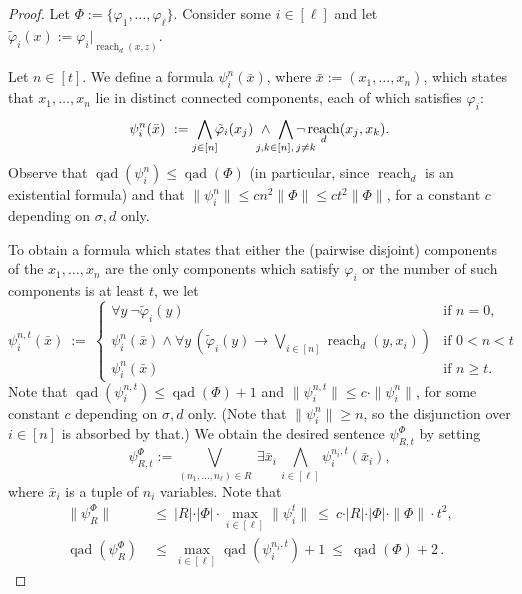 \documentclass[11pt]{article}
\renewcommand{\phi}{\varphi}
\newcommand{\size}[1]{\|#1\|}
\newcommand{\qad}[1]{\operatorname{qad}(#1)}
\newcommand{\absval}[1]{\vert #1 \vert}
\newcommand{\limplies}{\rightarrow}
\newcommand{\biglor}{\bigvee}
\newcommand{\bigland}{\bigwedge}
\newcommand{\rela}[2]{\ensuremath{{#1|}_{#2}}}
\DeclareMathOperator{\reach}{reach}
\newcommand{\set}[1]{\{#1\}}
\begin{document}
\begin{proof}
  Let $\Phi := \set{\phi_1, \ldots, \phi_\ell}$.
  Consider some $i\in
  [\ell]$ and let ${\tilde\phi}_{i}(x):=\rela{\phi_{i}}{\reach_{d}(x,z)}$.

  Let $n\in [t]$. We define a formula $\psi^{n}_{i}(\bar{x})$, where
  $\bar{x}:=(x_1, \ldots, x_n)$, which states that $x_1,\ldots,x_n$
  lie in distinct connected components, each of which satisfies
  $\phi_i$:
  \begin{align*}
    \psi^{n}_{i}(\bar{x}) \ := \ \smashoperator{\bigland_{j \in
        [n]}} {\tilde\phi}_{i}(x_j) \ \land \
    \smashoperator{\bigland_{j,k \in [n],\, j\neq k}} \lnot
    \reach_d(x_j,x_k).
  \end{align*}
  Observe that $\qad{\psi^{n}_{i}} \leq \qad{\Phi}$ (in particular,
  since $\reach_d$ is an existential formula) and that
  $\size{\psi^{n}_{i}} \leq c n^2 \size{\Phi} \leq c t^2 \size{\Phi}$,
  for a constant $c$ depending on $\sigma,d$ only.

  To obtain a formula which states that either the (pairwise disjoint)
  components of the $x_1, \ldots, x_n$ are the only components which
  satisfy $\phi_i$ or the number of such components is at least $t$,
  we let
  \[
  \psi^{n,t}_{i}(\bar{x})\ :=\
  \begin{cases}
    \forall y\ \lnot{\tilde\phi}_{i}(y) &\text{if }n = 0,
    \\
    \psi^{n}_{i}(\bar{x}) \land \forall y\,({\tilde\phi}_{i}(y)
    \limplies \biglor_{i\in [n]} \reach_d(y,x_i)) &\text{if $0 <
      n < t$}
    \\
    \psi^{n}_{i}(\bar{x}) &\text{if $n \geq t$}.
  \end{cases}
  \]
  Note that $\qad{\psi^{n,t}_{i}} \leq \qad{\Phi} + 1$ and
  $\size{\psi^{n,t}_{i}} \leq c \cdot \size{\psi^{n}_{i}}$, for some constant $c$
  depending on $\sigma,d$ only. (Note that $\size{\psi^n_i} \geq n$, so the
  disjunction over $i \in [n]$ is absorbed by that.) We obtain the desired
  sentence $\psi^{\Phi}_{R,t}$ by setting 
  \[
  \psi^{\Phi}_{R,t} := \biglor_{(n_1, \ldots, n_\ell)\in R} \
  \exists {\bar x}_i\,\bigland_{i \in [\ell]}  \psi^{n_i,t}_{i}({\bar x}_i),
  \]
  where ${\bar x}_i$ is a tuple of $n_i$ variables. Note that
  \[\begin{split}
    \size{\psi^{\Phi}_{R}} & \ \leq \ \absval{R} \cdot \absval{\Phi} \cdot \max_{i\in [\ell]} \size{\psi^{t}_{i}} \ \leq \ c
    \cdot \absval{R} \cdot \absval{\Phi} \cdot \size{\Phi} \cdot  t^2,
    \\
    \qad{\psi^{\Phi}_R} &\ \leq \ \max_{i\in [\ell]} \qad{\psi^{n_i,t}_{i}} + 1
    \ \leq \ \qad{\Phi} + 2\, . 
  \end{split}
  \]\end{proof}
\end{document}
